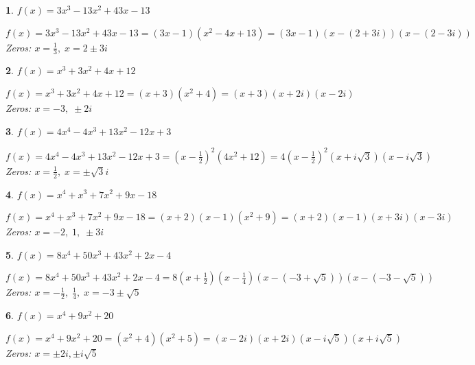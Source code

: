 \documentclass{amsbook}
\newtheorem{exc}{}
\newenvironment{ex}{\begin{exc}\normalfont}{\end{exc}}
\numberwithin{section}{chapter}
\numberwithin{equation}{chapter}
\begin{document}
\begin{multicols}{2}
\begin{ex}
		$f(x) = 3x^{3} - 13x^{2} + 43x - 13 $
	\begin{sol}
		$f(x) = 3x^{3} - 13x^{2} + 43x - 13 = (3x - 1)(x^{2} - 4x + 13) = (3x - 1)(x - (2 + 3i))(x - (2 - 3i))$\\
		Zeros: $x = \frac{1}{3}, \; x = 2 \pm 3i$
	\end{sol}
\end{ex}


\begin{ex}
		$f(x) = x^3 + 3x^2 + 4x + 12 $
	\begin{sol}
		$f(x) = x^3 + 3x^2 + 4x + 12 = (x+3) \left(x^2 + 4 \right) = (x+3)(x+2i)(x-2i)$ \\
		Zeros:  $x = -3, \; \pm 2i$
	\end{sol}
\end{ex}


\begin{ex}
	$f(x) = 4x^{4} - 4x^{3} + 13x^{2} - 12x + 3$
	\begin{sol}
		 $f(x) = 4x^{4} - 4x^{3} + 13x^{2} - 12x + 3 = \left(x - \frac{1}{2}\right)^{2}\left(4x^{2} + 12\right) = 4\left(x - \frac{1}{2}\right)^{2}(x + i\sqrt{3})(x - i\sqrt{3})$\\
		Zeros: $x = \frac{1}{2}, \; x = \pm \sqrt{3}i$
	\end{sol}
\end{ex}


\begin{ex}
	$f(x) = x^4+x^3+7x^2+9x-18$
	\begin{sol}
		 $f(x) = x^4+x^3+7x^2+9x-18 = (x+2)(x-1)\left(x^2+9\right) = (x+2)(x-1)(x+3i)(x-3i)$\\
		Zeros:  $x = -2, \; 1, \; \pm 3i$
	\end{sol}
\end{ex}


\begin{ex}
		 $f(x) = 8x^4+50x^3+43x^2+2x-4$
	\begin{sol}
		 $f(x) = 8x^4+50x^3+43x^2+2x-4 = 8\left(x + \frac{1}{2}\right) \left(x - \frac{1}{4}\right)(x - (-3 + \sqrt{5}))(x - (-3 - \sqrt{5}))$ \\
		Zeros:  $x = -\frac{1}{2}, \; \frac{1}{4}, \; x = -3 \pm \sqrt{5}$
	\end{sol}
\end{ex}


\begin{ex}
		$f(x) = x^4+9x^2+20 $
	\begin{sol}
		$f(x) = x^4+9x^2+20 = \left(x^2+4\right) \left(x^2+5\right) = (x-2i)(x+2i)\left(x - i \sqrt{5}\right)\left(x + i \sqrt{5}\right)$\\
		Zeros:  $x = \pm 2i, \pm i \sqrt{5}$
	\end{sol}
\end{ex}



\end{multicols}
\end{document}
